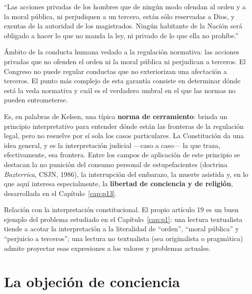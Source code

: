 \documentclass[12pt,oneside]{book}
\begin{document}
\begin{defbox}
``Las acciones privadas de los hombres que de ningún modo ofendan al orden y a la
moral pública, ni perjudiquen a un tercero, están sólo reservadas a Dios, y
exentas de la autoridad de los magistrados. Ningún habitante de la Nación será
obligado a hacer lo que no manda la ley, ni privado de lo que ella no prohíbe.''
\end{defbox}

\begin{defbox}
Ámbito de la conducta humana vedado a la regulación normativa: las acciones
privadas que no ofenden el orden ni la moral pública ni perjudican a terceros. El
Congreso no puede regular conductas que no exteriorizan una afectación a terceros.
El punto más complejo de esta garantía consiste en determinar dónde está la veda
normativa y cuál es el verdadero umbral en el que las normas no pueden
entrometerse.
\end{defbox}

Es, en palabras de Kelsen, una típica \textbf{norma de cerramiento}: brinda un
principio interpretativo para entender dónde están las fronteras de la regulación
legal, pero no resuelve por sí sola los casos particulares. La Constitución da una
idea general, y es la interpretación judicial —caso a caso— la que traza,
efectivamente, esa frontera. Entre los campos de aplicación de este principio se
destacan la no punición del consumo personal de estupefacientes (doctrina
\textit{Bazterrica}, CSJN, 1986), la interrupción del embarazo, la muerte asistida
y, en lo que aquí interesa especialmente, la \textbf{libertad de conciencia y de
religión}, desarrollada en el Capítulo~\ref{cap:p13}.

\begin{impbox}
Relación con la interpretación constitucional. El propio artículo 19 es un buen
ejemplo del problema estudiado en el Capítulo~\ref{cap:p1}: una lectura
textualista tiende a acotar la interpretación a la literalidad de ``orden'',
``moral pública'' y ``perjuicio a terceros''; una lectura no textualista (sea
originalista o pragmática) admite proyectar esas expresiones a los valores y
problemas actuales.
\end{impbox}

\section{La objeción de conciencia}
\end{document}
